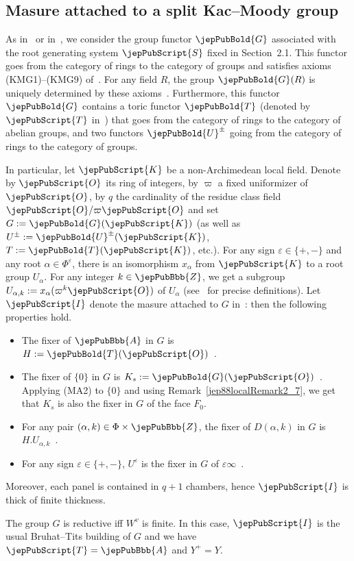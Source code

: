 \subsection{Masure attached to a split Kac--Moody group}
As in~\cite{jep88refTit87} or in~\cite[Chap.~8]{jep88refRem02}, we consider the group functor $\jepPubBold{G}$ associated with the root generating system $\jepPubScript{S}$ fixed in Section~2.1. This functor goes from the category of rings to the category of groups and satisfies axioms (KMG1)--(KMG9) of~\cite{jep88refTit87}. For any field $R$, the group $\jepPubBold{G}(R)$ is uniquely determined by these axioms~\cite[Th.~1']{jep88refTit87}. Furthermore, this functor $\jepPubBold{G}$ contains a toric functor $\jepPubBold{T}$ (denoted by $\jepPubScript{T}$ in~\cite{jep88refRem02}) that goes from the category of rings to the category of abelian groups, and two functors $\jepPubBold{U}^{\pm}$ going from the category of rings to the category of groups.

In particular, let $\jepPubScript{K}$ be a non-Archimedean local field. Denote by $\jepPubScript{O}$ its ring of integers, by $\varpi$ a fixed uniformizer of $\jepPubScript{O}$, by $q$ the cardinality of the residue class field $\jepPubScript{O}/\varpi\jepPubScript{O}$ and set $G:=\jepPubBold{G}(\jepPubScript{K})$ (as well as $U^\pm:=\jepPubBold{U}^{\pm}(\jepPubScript{K})$, $T:=\jepPubBold{T}(\jepPubScript{K})$, etc.). For any sign $\varepsilon\in\{+,-\}$ and any root $\alpha\in\Phi^\varepsilon$, there is an isomorphism $x_\alpha$ from $\jepPubScript{K}$ to a root group $U_\alpha$. For any integer $k\in\jepPubBbb{Z}$, we get a subgroup $U_{\alpha,k}:=x_\alpha(\varpi^k\jepPubScript{O})$ of $U_\alpha$ (see~\cite[\S3.1]{jep88refGR08} for precise definitions). Let $\jepPubScript{I}$ denote the masure attached to $G$ in~\cite{jep88refRou17}: then the following properties hold.
\begin{itemize}
\item The fixer of $\jepPubBbb{A}$ in $G$ is $H:=\jepPubBold{T}(\jepPubScript{O})$~\cite[Rem.~3.2]{jep88refGR08}.
\item The fixer of $\{0\}$ in $G$ is $K_s:=\jepPubBold{G}(\jepPubScript{O})$~\cite[Exam.~3.14]{jep88refGR08}. Applying (MA2) to $\{0\}$ and using Remark~\ref{jep88localRemark2_7}, we get that $K_s$ is also the fixer in $G$ of the face $F_0$.
\item For any pair $(\alpha,k)\in\Phi\times\jepPubBbb{Z}$, the fixer of $D(\alpha,k)$ in $G$ is $H.U_{\alpha,k}$~\cite[Exer.~4.2.7)]{jep88refGR08}.
\item For any sign $\varepsilon\in\{+,-\}$, $U^\varepsilon$ is the fixer in $G$ of $\varepsilon\infty$~\cite[Exam.~4.2.4)]{jep88refGR08}.
\end{itemize}
Moreover, each panel is contained in $q+1$ chambers, hence $\jepPubScript{I}$ is thick of finite thickness.
\begin{remark}\label{jep88localRemark2_9}
The group $G$ is reductive iff $W^v$ is finite. In this case, $\jepPubScript{I}$ is the usual Bruhat--Tits building of $G$ and we have $\jepPubScript{T}=\jepPubBbb{A}$ and $Y^+=Y$.
\end{remark}
